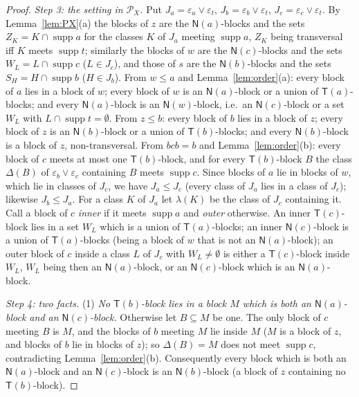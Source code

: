 \documentclass[11pt]{amsart}
\theoremstyle{definition}
\renewcommand{\P}{\mathcal{P}}      %
\newcommand{\supp}{\operatorname{supp}}
\newcommand{\T}{\mathsf{T}}
\newcommand{\N}{\mathsf{N}}
\begin{document}
\begin{proof}
\smallskip
\emph{Step 3: the setting in $\P_X$.} Put $J_a=\varepsilon_a\vee\varepsilon_t$, $J_b=\varepsilon_b\vee\varepsilon_t$, $J_c=\varepsilon_c\vee\varepsilon_t$. By Lemma~\ref{lem:PX}(a) the blocks of $z$ are the $\N(a)$-blocks and the sets $Z_K=K\cap\supp a$ for the classes $K$ of $J_a$ meeting $\supp a$, $Z_K$ being transversal iff $K$ meets $\supp t$; similarly the blocks of $w$ are the $\N(c)$-blocks and the sets $W_L=L\cap\supp c$ ($L\in J_c$), and those of $s$ are the $\N(b)$-blocks and the sets $S_H=H\cap\supp b$ ($H\in J_b$). From $w\le a$ and Lemma~\ref{lem:order}(a): every block of $a$ lies in a block of $w$; every block of $w$ is an $\N(a)$-block or a union of $\T(a)$-blocks; and every $\N(a)$-block is an $\N(w)$-block, i.e.\ an $\N(c)$-block or a set $W_L$ with $L\cap\supp t=\emptyset$. From $z\le b$: every block of $b$ lies in a block of $z$; every block of $z$ is an $\N(b)$-block or a union of $\T(b)$-blocks; and every $\N(b)$-block is a block of $z$, non-transversal. From $bcb=b$ and Lemma~\ref{lem:order}(b): every block of $c$ meets at most one $\T(b)$-block, and for every $\T(b)$-block $B$ the class $\Delta(B)$ of $\varepsilon_b\vee\varepsilon_c$ containing $B$ meets $\supp c$. Since blocks of $a$ lie in blocks of $w$, which lie in classes of $J_c$, we have $J_a\le J_c$ (every class of $J_a$ lies in a class of $J_c$); likewise $J_b\le J_a$. For a class $K$ of $J_a$ let $\lambda(K)$ be the class of $J_c$ containing it. Call a block of $c$ \emph{inner} if it meets $\supp a$ and \emph{outer} otherwise. An inner $\T(c)$-block lies in a set $W_L$ which is a union of $\T(a)$-blocks; an inner $\N(c)$-block is a union of $\T(a)$-blocks (being a block of $w$ that is not an $\N(a)$-block); an outer block of $c$ inside a class $L$ of $J_c$ with $W_L\ne\emptyset$ is either a $\T(c)$-block inside $W_L$, $W_L$ being then an $\N(a)$-block, or an $\N(c)$-block which is an $\N(a)$-block.

\emph{Step 4: two facts.} (1) \emph{No $\T(b)$-block lies in a block $M$ which is both an $\N(a)$-block and an $\N(c)$-block.} Otherwise let $B\subseteq M$ be one. The only block of $c$ meeting $B$ is $M$, and the blocks of $b$ meeting $M$ lie inside $M$ ($M$ is a block of $z$, and blocks of $b$ lie in blocks of $z$); so $\Delta(B)=M$ does not meet $\supp c$, contradicting Lemma~\ref{lem:order}(b). Consequently every block which is both an $\N(a)$-block and an $\N(c)$-block is an $\N(b)$-block (a block of $z$ containing no $\T(b)$-block).


\end{proof}
\end{document}
